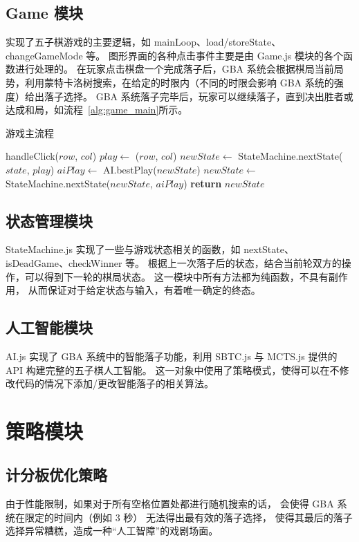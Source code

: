 \documentclass[UTF8,cs4size]{ctexart}
\begin{document}
\subsection{Game 模块}
实现了五子棋游戏的主要逻辑，如 mainLoop、load/storeState、changeGameMode 等。
图形界面的各种点击事件主要是由 Game.js 模块的各个函数进行处理的。
在玩家点击棋盘一个完成落子后，GBA 系统会根据棋局当前局势，利用蒙特卡洛树搜索，在给定的时限内（不同的时限会影响 GBA 系统的强度）给出落子选择。
GBA 系统落子完毕后，玩家可以继续落子，直到决出胜者或达成和局，如流程~\ref{alg:game_main}所示。

\begin{algorithm}
	\algrenewcommand{}
	\algrenewcommand{}
	\caption{游戏主流程}
	\label{alg:game_main}
  \begin{algorithmic}[1]
      \State handleClick($row$, $col$)
      \State $play \gets$ ($row$, $col$)
      \State $newState \gets$ StateMachine.nextState($state$, $play$)
      \State $aiPlay \gets$ AI.bestPlay($newState$)
      \State $newState \gets$ StateMachine.nextState($newState$, $aiPlay$)
    \EndWhile
    \State \textbf{return} $newState$
	\end{algorithmic}  
\end{algorithm}
\clearpage

\subsection{状态管理模块}
StateMachine.js 实现了一些与游戏状态相关的函数，如 nextState、isDeadGame、checkWinner 等。
根据上一次落子后的状态，结合当前轮双方的操作，可以得到下一轮的棋局状态。
这一模块中所有方法都为纯函数，不具有副作用，
从而保证对于给定状态与输入，有着唯一确定的终态。

\subsection{人工智能模块}
AI.js 实现了 GBA 系统中的智能落子功能，利用 SBTC.js 与 MCTS.js 提供的 API 构建完整的五子棋人工智能。
这一对象中使用了策略模式，使得可以在不修改代码的情况下添加/更改智能落子的相关算法。
\clearpage

\section{策略模块}
\subsection{计分板优化策略}
由于性能限制，如果对于所有空格位置处都进行随机搜索的话，
会使得 GBA 系统在限定的时间内（例如 3 秒） 无法得出最有效的落子选择，
使得其最后的落子选择异常糟糕，造成一种“人工智障”的戏剧场面。
\end{document}
